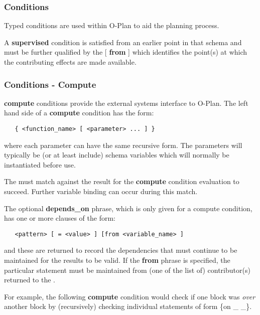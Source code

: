 \subsubsection{Conditions}
 
Typed conditions are used within O-Plan to aid the planning process.

A {\bf supervised} condition is satisfied from an earlier point in that
schema and must be further qualified by the [ {\bf from}
 ] which identifies the point(s) at which the
contributing effects are made available. 

\subsubsection{Conditions - Compute}

{\bf compute} conditions provide the external systems interface to O-Plan.
The left hand side of a {\bf compute} condition has the form:

\begin{verbatim}
   { <function_name> [ <parameter> ... ] }
\end{verbatim}

where each parameter can have the same recursive form.  The parameters
will typically be (or at least include) schema variables which will normally
be instantiated before use.

The  must match against the result for the {\bf compute}
condition evaluation to succeed.  Further variable binding can occur during
this match.

The optional {\bf depends\_on} phrase, which is only
given for a compute condition, has one or more 
clauses of the form:

\begin{verbatim}
   <pattern> [ = <value> ] [from <variable_name> ]
\end{verbatim}

and these are returned to record the dependencies that must continue to
be maintained for the results to be valid.  If the {\bf from} phrase is
specified, the particular statement must be maintained from (one of the
list of) contributor(s) returned to the .

For example, the following {\bf compute} condition would check if
one block was {\em over} another block by (recursively) checking
individual statements of form \{on \_ \_\}.

